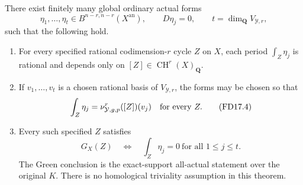 \begin{theorem}
\label{r17fd:finite-tests}
There exist finitely many global ordinary actual forms
\[
 \eta_1,\ldots,\eta_t\in B^{n-r,n-r}(X^{\mathrm{an}}),
 \qquad D\eta_j=0,
 \qquad t=\dim_{\mathbf Q}V_{\mathcal Y,r},
 \tag{FD17.3}\label{r17fd:actual-tests}
\]
such that the following hold.
\begin{enumerate}
\item For every specified rational codimension-$r$ cycle
      $Z$ on $X$, each period $\int_Z\eta_j$ is rational
      and depends only on $[Z]\in\operatorname{CH}^r(X)_{\mathbf Q}$.
\item If $v_1,\ldots,v_t$ is a chosen rational basis of
      $V_{\mathcal Y,r}$, the forms may be chosen so that
\[
       \int_Z\eta_j
            =\nu_{\mathcal Y,g,p}^r([Z])(v_j)
                \quad\hbox{for every }Z.
 \tag{FD17.4}\label{r17fd:periods}
\]
\item Every such specified $Z$ satisfies
\[
 \boxed{\quad
   G_X(Z)\quad\Longleftrightarrow\quad
            \int_Z\eta_j=0\ \text{for all }1\le j\le t.
       \quad}
 \tag{FD17.5}\label{r17fd:criterion}
\]
The Green conclusion is the exact-support all-actual
statement over the original $K$. There is no homological
triviality assumption in this theorem.
\end{enumerate}
\end{theorem}

